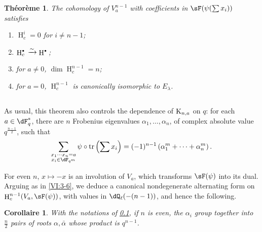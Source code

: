 \documentclass[oneside]{book}
\DeclareMathOperator{\h}{H}
\DeclareMathOperator{\tr}{tr}
\newcommand{\iso}{\xrightarrow\sim}
\newcommand{\kloos}{\textnormal{K}} %
\theoremstyle{sga-source}
\theoremstyle{sga-source-dash}
\theoremstyle{sga-source-dotdash}
\theoremstyle{sga-source-number-note-dash}
\theoremstyle{sga-source-note-number-dotdash}
\theoremstyle{sga-source-example-dotdash}
\theoremstyle{sga-source-inline-number}
\theoremstyle{sga-source-bare-number}
\theoremstyle{sga-source}
\newtheorem{corollary_}[subsection]{Corollaire}
\newtheorem{theorem_}[subsection]{Théorème}
\let\oldbullet\bullet
\renewcommand{\bullet}{\textnormal{\tiny$\oldbullet$}}
\newcommand{\PrintPage}[1]{}\newcommand{\MathPage}[1]{}\newcommand{\PrintCite}[2]{#1}\newcommand{\var}[3]{#1}
\begin{document}
\begin{theorem_}\label{VI:7-4}
The cohomology of $V_a^{n-1}$ with coefficients in $\sF(\psi(\sum x_i))$ satisfies 
\begin{enumerate}[\indent (i)]
  \item $\h_c^i=0$ for $i\ne n-1$; 
  \item $\h_c^\bullet{} \iso \h^\bullet{}$; 
  \item for $a\ne 0$, $\dim \h_c^{n-1}{}=n$; 
  \PrintPage{221}
\item for $a=0$, $\h_c^{n-1}{}$ is canonically isomorphic to $E_\lambda$. 
\end{enumerate}
\end{theorem_}





\subsection{}\label{VI:7-5}

As usual, this theorem also controls the dependence of 
$\kloos_{n,a}$ on $q$: for each $a\in \dF_q^\ast$, there are $n$ Frobenius 
eigenvalues $\alpha_1,\dots,\alpha_n$, of complex absolute value 
$q^{\frac{n-1}{2}}$, such that 
\[
  \sum_{\substack{x_1\dotsm x_n = a \\ x_i\in \dF_{q^m}}} \psi\circ \tr\left(\sum x_i\right) = (-1)^{n-1} \left(\alpha_1^m + \cdots + \alpha_n^m \right) \text{.} 
\]

For even $n$, $x\mapsto -x$ is an involution of $V_a$, which transforms 
$\sF(\psi)$ into its dual. Arguing as in \ref{VI:3-6}, we deduce a 
canonical nondegenerate alternating form on $\h_c^{n-1}(V_a,\sF(\psi))$, 
with values in $\dQ_\ell(-(n-1))$, and hence the following. 





\begin{corollary_}\label{VI:7-6}
With the notations of \ref{VI:7-5}, if $n$ is even, the $\alpha_i$ group together 
into $\frac n 2$ pairs of roots $\alpha,\bar\alpha$ whose product is 
$q^{n-1}$. 
\end{corollary_}





\subsection{}\label{VI:7-7}
\end{document}
